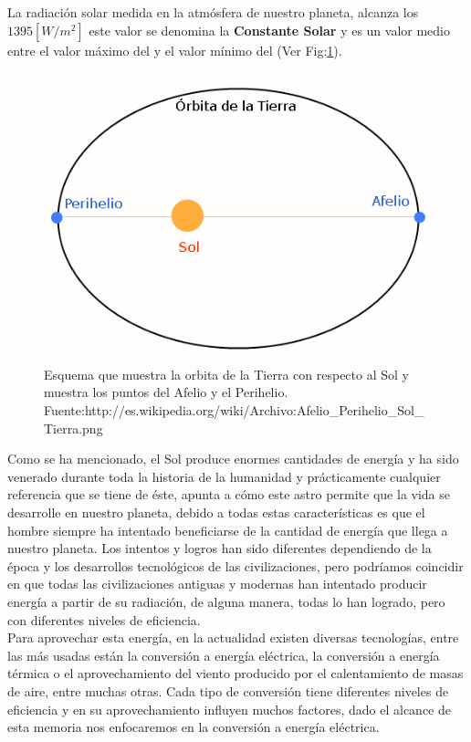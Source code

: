 La radiación solar medida en la atmósfera de nuestro planeta, alcanza los $1395 [W/{m}^{2}]$ este valor se denomina la \textbf{Constante Solar} y es un valor medio entre el valor máximo del  y el valor mínimo del  (Ver Fig:\ref{afelioperielio}).\\

\begin{figure}[h!]
        \centering
        \includegraphics[scale=0.5]{images/afelioPerihelio}
		\caption{ Esquema que muestra la orbita de la Tierra con respecto al Sol y muestra los puntos del Afelio y el Perihelio. \tiny{Fuente:http://es.wikipedia.org/wiki/Archivo:Afelio\_Perihelio\_Sol\_Tierra.png}}
	\label{afelioperielio}
\end{figure}

Como se ha mencionado, el Sol produce enormes cantidades de energía y ha sido venerado durante toda la historia de la humanidad y prácticamente cualquier referencia que se tiene de éste, apunta a cómo este astro permite que la vida se desarrolle en nuestro planeta, debido a todas estas características es que el hombre siempre ha intentado beneficiarse de la cantidad de energía que llega a nuestro planeta. Los intentos y logros han sido diferentes dependiendo de la época y los desarrollos tecnológicos de las civilizaciones, pero podríamos coincidir en que todas las civilizaciones antiguas y modernas han intentado producir energía a partir de su radiación, de alguna manera, todas lo han logrado, pero con diferentes niveles de eficiencia.\\

Para aprovechar esta energía, en la actualidad existen diversas tecnologías, entre las más usadas están la conversión a energía eléctrica, la conversión a energía térmica o el aprovechamiento del viento producido por el calentamiento de masas de aire, entre muchas otras. Cada tipo de conversión tiene diferentes niveles de eficiencia y en su aprovechamiento influyen muchos factores, dado el alcance de esta memoria nos enfocaremos en la conversión a energía eléctrica.\\

